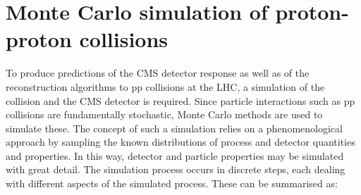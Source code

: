 \section{Monte Carlo simulation of proton-proton collisions}
\label{sec:MonteCarlo}
To produce predictions of the CMS detector response as well as of the reconstruction algorithms to pp collisions at the LHC, a simulation of the collision and the CMS detector is required. Since particle interactions such as pp collisions are fundamentally stochastic, Monte Carlo methods \cite{MonteCarlo} are used to simulate these. The concept of such a simulation relies on a phenomenological approach by sampling the known distributions of process and detector quantities and properties. In this way, detector and particle properties may be simulated with great detail. The simulation process occurs in discrete steps, each dealing with different aspects of the simulated process. These can be summarised as: 

